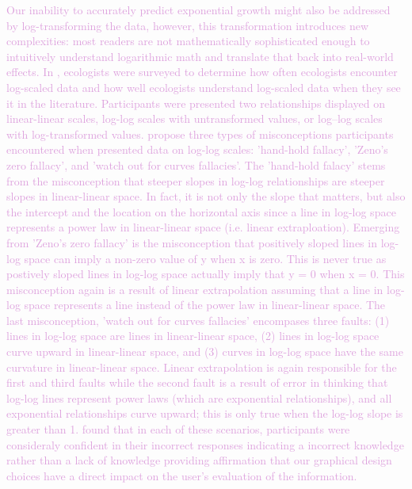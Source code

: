 \documentclass[]{interact}
\theoremstyle{plain}%
\theoremstyle{definition}
\theoremstyle{remark}
\begin{document}
\textcolor{Plum}{Our inability to accurately predict exponential growth might also be addressed by log-transforming the data, however, this transformation introduces new complexities: most readers are not mathematically sophisticated enough to intuitively understand logarithmic math and translate that back into real-world effects.
In \cite{menge_logarithmic_2018}, ecologists were surveyed to determine how often ecologists encounter log-scaled data and how well ecologists understand log-scaled data when they see it in the literature. 
Participants were presented two relationships displayed on linear-linear scales, log-log scales with untransformed values, or log–log scales with log-transformed values. 
\cite{menge_logarithmic_2018} propose three types of misconceptions participants encountered when presented data on log-log scales: 'hand-hold fallacy', 'Zeno's zero fallacy', and 'watch out for curves fallacies'. 
The 'hand-hold falacy' stems from the misconception that steeper slopes in log-log relationships are steeper slopes in linear-linear space. 
In fact, it is not only the slope that matters, but also the intercept and the location on the horizontal axis since a line in log-log space represents a power law in linear-linear space (i.e. linear extraploation). 
Emerging from 'Zeno's zero fallacy' is the misconception that positively sloped lines in log-log space can imply a non-zero value of y when x is zero. This is never true as postively sloped lines in log-log space actually imply that y = 0 when x = 0. 
This misconception again is a result of linear extrapolation assuming that a line in log-log space represents a line instead of the power law in linear-linear space. 
The last misconception, 'watch out for curves fallacies' encompases three faults: (1) lines in log-log space are lines in linear-linear space, (2) lines in log-log space curve upward in linear-linear space, and (3) curves in log-log space have the same curvature in linear-linear space. 
Linear extrapolation is again responsible for the first and third faults while the second fault is a result of error in thinking that log-log lines represent power laws (which are exponential relationships), and all exponential relationships curve upward; this is only true when the log-log slope is greater than 1.
\cite{menge_logarithmic_2018} found that in each of these scenarios, participants were consideraly confident in their incorrect responses indicating a incorrect knowledge rather than a lack of knowledge providing affirmation that our graphical design choices have a direct impact on the user's evaluation of the information.
}
\end{document}
